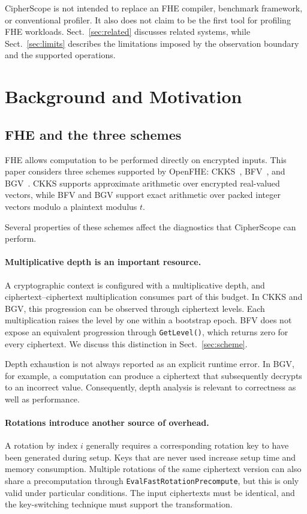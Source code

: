 \documentclass[pdflatex,sn-basic,Numbered,iicol]{sn-jnl}
\begin{document}
CipherScope is not intended to replace an FHE compiler, benchmark framework,
or conventional profiler. It also does not claim to be the first tool for
profiling FHE workloads. Sect.~\ref{sec:related} discusses related systems, while
Sect.~\ref{sec:limits} describes the limitations imposed by the observation
boundary and the supported operations.

\section{Background and Motivation}
\label{sec:background}

\subsection{FHE and the three schemes}

FHE allows computation to be performed directly on encrypted inputs. This
paper considers three schemes supported by OpenFHE: CKKS~\cite{ckks2017},
BFV~\cite{brakerski2012,fv2012}, and BGV~\cite{bgv2012}. CKKS supports
approximate arithmetic over encrypted real-valued vectors, while BFV and BGV
support exact arithmetic over packed integer vectors modulo a plaintext
modulus $t$.

Several properties of these schemes affect the diagnostics that CipherScope
can perform.

\paragraph{Multiplicative depth is an important resource.} A cryptographic
context is configured with a multiplicative depth, and
ciphertext--ciphertext multiplication consumes part of this budget. In CKKS
and BGV, this progression can be observed through ciphertext levels. Each
multiplication raises the level by one within a bootstrap epoch. BFV does not
expose an equivalent progression through \texttt{GetLevel()}, which returns
zero for every ciphertext. We discuss this distinction in
Sect.~\ref{sec:scheme}.

Depth exhaustion is not always reported as an explicit runtime error. In BGV,
for example, a computation can produce a ciphertext that subsequently
decrypts to an incorrect value. Consequently, depth analysis is relevant to
correctness as well as performance.

\paragraph{Rotations introduce another source of overhead.} A rotation by
index $i$ generally requires a corresponding rotation key to have been
generated during setup. Keys that are never used increase setup time and
memory consumption. Multiple rotations of the same ciphertext version can
also share a precomputation through \texttt{EvalFastRotationPrecompute}, but
this is only valid under particular conditions. The input ciphertexts must be
identical, and the key-switching technique must support the transformation.
\end{document}
